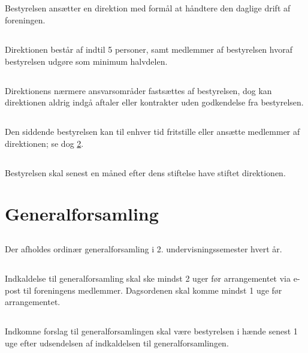 \documentclass[danish,a4paper,twocolumn,oneside,article]{memoir}
\begin{document}
\section{} Bestyrelsen ansætter en direktion med formål at håndtere den daglige drift af foreningen.

\section{}\label{s:directors_rules} Direktionen består af indtil 5 personer, samt medlemmer af bestyrelsen hvoraf bestyrelsen udgøre som minimum halvdelen.

\section{} Direktionens nærmere ansvarsområder fastsættes af bestyrelsen, dog kan direktionen aldrig indgå aftaler eller kontrakter uden godkendelse fra bestyrelsen.

\section{} Den siddende bestyrelsen kan til enhver tid fritstille eller ansætte
medlemmer af direktionen; se dog \ref{s:directors_rules}.

\section{} Bestyrelsen skal senest en måned efter dens stiftelse have stiftet direktionen.

\chapter{Generalforsamling}

\section{} Der afholdes ordinær generalforsamling i 2. undervisningssemester hvert år.

\section{} Indkaldelse til generalforsamling skal ske mindst 2 uger før arrangementet via e-post til foreningens
medlemmer. Dagsordenen skal komme mindst 1 uge før arrangementet.

\section{} Indkomne forslag til generalforsamlingen skal være bestyrelsen i hænde senest 1 uge efter
udsendelsen af indkaldelsen til generalforsamlingen.
\end{document}

